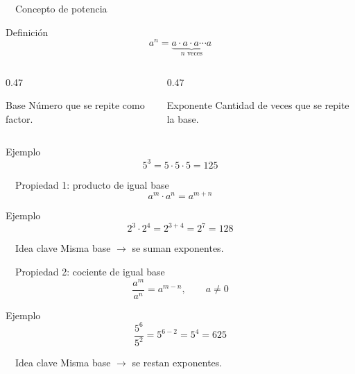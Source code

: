 \documentclass[aspectratio=169,10pt,handout]{beamer}
\newcommand{\pp}{\pause}
\newcommand{\iconoDesarrollo}{\faBrain}
\newcommand{\iconoIdea}{\faLightbulb}
\newenvironment{ideaBox}
{\begin{exampleblock}{\iconoIdea\ \ Idea clave}}
	{\end{exampleblock}}
\begin{document}
	\begin{frame}{\iconoDesarrollo\ \ Concepto de potencia}
		\begin{block}{Definición}
			\[
			a^n=\underbrace{a\cdot a\cdot a\cdots a}_{n\text{ veces}}
			\]
		\end{block}
		
		\pp
		
		\begin{columns}[T,totalwidth=\textwidth]
			\begin{column}{0.47\textwidth}
				\begin{block}{Base}
					Número que se repite como factor.
				\end{block}
			\end{column}
			\begin{column}{0.47\textwidth}
				\begin{exampleblock}{Exponente}
					Cantidad de veces que se repite la base.
				\end{exampleblock}
			\end{column}
		\end{columns}
		
		\pp
		
		\begin{exampleblock}{Ejemplo}
			\[
			5^3=5\cdot5\cdot5=125
			\]
		\end{exampleblock}
	\end{frame}
	
	\begin{frame}{\iconoDesarrollo\ \ Propiedad 1: producto de igual base}
		\[
		a^m\cdot a^n=a^{m+n}
		\]
		
		\pp
		
		\begin{exampleblock}{Ejemplo}
			\[
			2^3\cdot2^4=2^{3+4}=2^7=128
			\]
		\end{exampleblock}
		
		\pp
		
		\begin{ideaBox}
			Misma base \(\rightarrow\) se suman exponentes.
		\end{ideaBox}
	\end{frame}
	
	\begin{frame}{\iconoDesarrollo\ \ Propiedad 2: cociente de igual base}
		\[
		\frac{a^m}{a^n}=a^{m-n}, \qquad a\neq0
		\]
		
		\pp
		
		\begin{exampleblock}{Ejemplo}
			\[
			\frac{5^6}{5^2}=5^{6-2}=5^4=625
			\]
		\end{exampleblock}
		
		\pp
		
		\begin{ideaBox}
			Misma base \(\rightarrow\) se restan exponentes.
		\end{ideaBox}
	\end{frame}
	
\end{document}
